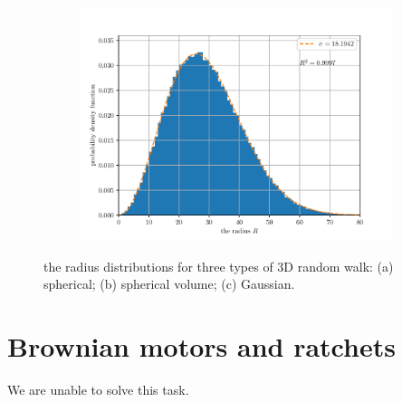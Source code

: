 \documentclass[paper=a4, fontsize=11pt]{scrartcl} %
\numberwithin{equation}{section} %
\numberwithin{figure}{section} %
\numberwithin{table}{section} %
\begin{document}
\begin{figure}[!ht]
\begin{subfigure}[!b]{0.495\textwidth}
		\caption{}
	\end{subfigure}
	\begin{subfigure}[!b]{0.495\textwidth}
		\centering
		\includegraphics[width=\linewidth]{figure_2_2.pdf}
		\caption{}
	\end{subfigure}
	\caption{the radius distributions for three types of 3D random walk: (a) spherical; (b) spherical volume; (c) Gaussian.}
	\label{fig:random_walks_in_3d}
\end{figure}


\section{Brownian motors and ratchets}

We are unable to solve this task.\par

\end{document}
